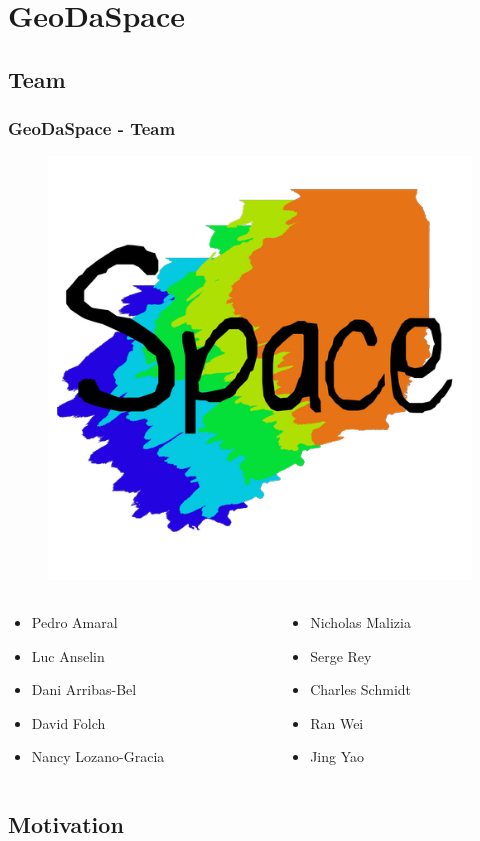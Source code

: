 \documentclass[nototal]{beamer}
\begin{document}
\section{GeoDaSpace} 

\subsection{Team} 

\begin{frame}
	\frametitle{GeoDaSpace - Team}
  \begin{center}
  \begin{figure}[htbp]
  \includegraphics[width=0.15\linewidth]{figs/geodaspace.png}
  \end{figure}
  \end{center}
  \begin{columns}
  \begin{column}{0.5\linewidth}
  \begin{itemize}
  \item Pedro Amaral
  \item Luc Anselin
  \item Dani Arribas-Bel
  \item David Folch
  \item Nancy Lozano-Gracia
  \end{itemize}
  \end{column}
  \begin{column}{0.5\linewidth}
  \begin{itemize}
  \item Nicholas Malizia
  \item Serge Rey
  \item Charles Schmidt
  \item Ran Wei
  \item Jing Yao
  \end{itemize}
  \end{column}
  \end{columns}		
 \end{frame} 

\subsection{Motivation} 
\end{document}
